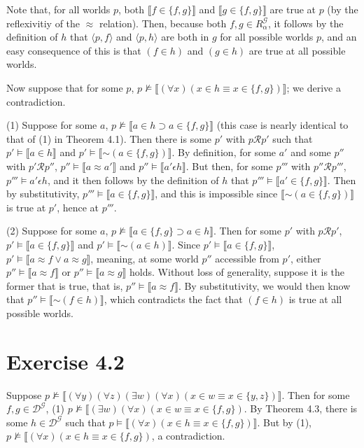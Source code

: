\documentclass{article}
\newcommand*{\oldneg}{\mathord{\sim}}
\newcommand{\lbc}{\llbracket}
\newcommand{\rbc}{\rrbracket}
\theoremstyle{definition}
\begin{document}
Note that, for all worlds
$p$, both $\lbc f\in\{f,g\}\rbc$ and $\lbc g\in\{f,g\}\rbc$ are true at $p$ (by the reflexivitiy of the $\approx$ relation). Then,
because both $f,g\in R^\mathcal{G}_\alpha$, it follows by the definition of $h$ that $\langle p,f\rangle$ and 
$\langle p,h\rangle$ are both in $g$ for all possible worlds $p$, and an easy consequence of this is that 
$(f\in h)$ and $(g\in h)$ are true at all possible worlds.


Now suppose that for some $p$, $p\nvDash\lbc(\forall x)(x\in h\equiv x\in\{f,g\})\rbc$; we derive a contradiction.

(1) Suppose for some $a$, $p\nvDash\lbc a\in h\supset a\in\{f,g\}\rbc$ (this case is nearly identical to that of 
(1) in Theorem 4.1). Then there is some $p'$ with 
$p\mathcal{R}p'$ such that $p'\vDash\lbc a\in h\rbc$ and $p'\vDash\lbc\oldneg (a\in\{f,g\})\rbc$. By definition, for some 
$a'$ and some $p''$ with $p'\mathcal{R}p''$, $p''\vDash\lbc a\approx a'\rbc$ and $p''\vDash\lbc a'\epsilon h\rbc$. But then, 
for some $p'''$ with $p''\mathcal{R}p'''$, $p'''\vDash a'\epsilon h$, and it then follows by the definition of $h$ that 
$p'''\vDash\lbc a'\in\{f,g\}\rbc$. Then by substitutivity, $p'''\vDash\lbc a\in\{f,g\}\rbc$, and this is impossible 
since $\lbc\oldneg(a\in\{f,g\})\rbc$ is true at $p'$, hence at $p'''$. 

(2) Suppose for some $a$, $p\nvDash\lbc a\in\{f,g\}\supset a\in h\rbc$. Then for some $p'$ with $p\mathcal{R}p'$, 
$p'\vDash\lbc a\in\{f,g\}\rbc$ and $p'\vDash\lbc\oldneg(a\in h)\rbc$. Since $p'\vDash\lbc a\in\{f,g\}\rbc$, 
$p'\vDash\lbc a\approx f\vee a\approx g\rbc$, meaning, at some world $p''$ accessible from $p'$, either 
$p''\vDash\lbc a\approx f\rbc$ or $p''\vDash\lbc a\approx g\rbc$ holds. Without loss of generality, suppose 
it is the former that is true, that is, $p''\vDash\lbc a\approx f\rbc$. By substitutivity, we would then know that 
$p''\vDash\lbc\oldneg(f\in h)\rbc$, which contradicts the fact that 
$(f\in h)$ is true at all possible worlds. 

\section*{Exercise 4.2}
Suppose $p\nvDash\lbc(\forall y)(\forall z)(\exists w)(\forall x)(x\in w\equiv x\in\{y,z\})\rbc$. Then for some 
$f,g\in\mathcal{D}^\mathcal{G}$, (1) $p\nvDash\lbc(\exists w)(\forall x)(x\in w\equiv x\in\{f,g\})$. By 
Theorem 4.3, there is some $h\in\mathcal{D}^\mathcal{G}$ such that 
$p\vDash\lbc(\forall x)(x\in h\equiv x\in\{f,g\})\rbc$. But by (1), 
$p\nvDash\lbc(\forall x)(x\in h\equiv x\in\{f,g\})$, a contradiction.
\end{document}
